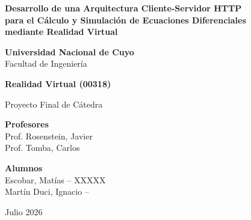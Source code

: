 \documentclass[12pt, a4paper]{article}
\begin{document}
\thispagestyle{empty}

\begin{center}

    \vspace*{1.5cm}

    {\large\bfseries
        Desarrollo de una Arquitectura Cliente-Servidor HTTP\\[5pt]
        para el Cálculo y Simulación de Ecuaciones Diferenciales\\[5pt]
        mediante Realidad Virtual
    }

    \vspace{1.8cm}

    {\LARGE\bfseries\color{azulUNC} Universidad Nacional de Cuyo}\\[6pt]
    {\large Facultad de Ingeniería}

    \vspace{3cm}

    {\large\color{verdeRV}\bfseries Realidad Virtual (00318)}

    \vspace{0.4cm}

    {\normalsize Proyecto Final de Cátedra}

    \vspace{3cm}

    {\normalsize\bfseries Profesores}\\[6pt]
    {\normalsize\color{azulUNC}
        Prof. Rosenstein, Javier \\[4pt]
        Prof. Tomba, Carlos
    }

    \vspace{1.2cm}

    {\normalsize\bfseries Alumnos}\\[6pt]
    {\normalsize\color{azulUNC}
        Escobar, Matías \quad -- \quad XXXXX \\[4pt]
        Martín Duci, Ignacio \quad -- 
    }

    \vspace{1.2cm}

    {\normalsize Julio 2026}

\end{center}

\newpage
\thispagestyle{fancy}
\tableofcontents

\newpage
\thispagestyle{fancy}
\end{document}
